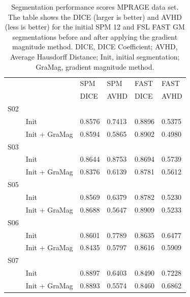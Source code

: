 \begin{table}[!ht]
\centering
\caption{
Segmentation performance scores MPRAGE data set. The table shows the DICE (larger is better) and AVHD (less is better) for the initial SPM 12 and FSL FAST GM segmentations before and after applying the gradient magnitude method. DICE, DICE Coefficient; AVHD, Average Hausdorff Distance; Init, initial segmentation; GraMag, gradient magnitude method.}
\begin{tabular}{llllll}
\\
\toprule
     &                & SPM   & SPM   & FAST  & FAST  \\
     &                & DICE  & AVHD  & DICE  & AVHD  \\
\midrule
 S02 &                &            &            &             &             \\
     & Init           & 0.8576     & 0.7413     & 0.8896      & 0.5375      \\
     & Init + GraMag  & 0.8594     & 0.5865     & 0.8902      & 0.4980      \\
 S03 &                &            &            &             &             \\
     & Init           & 0.8644     & 0.8753     & 0.8694      & 0.5739      \\
     & Init + GraMag  & 0.8376     & 0.6139     & 0.8781      & 0.5612      \\
 S05 &                &            &            &             &             \\
     & Init           & 0.8569     & 0.6379     & 0.8782      & 0.5230      \\
     & Init + GraMag  & 0.8688     & 0.5647     & 0.8909      & 0.5233      \\
 S06 &                &            &            &             &             \\
     & Init           & 0.8601     & 0.7789     & 0.8635      & 0.6477      \\
     & Init + GraMag  & 0.8435     & 0.5797     & 0.8616      & 0.5909      \\
 S07 &                &            &            &             &             \\
     & Init           & 0.8897     & 0.6403     & 0.8490      & 0.7228      \\
     & Init + GraMag  & 0.8893     & 0.5574     & 0.8460      & 0.6862      \\
\bottomrule
\end{tabular}
\label{tab:table1}
\end{table}

